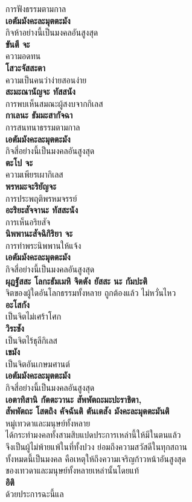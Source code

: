\documentclass[12pt]{article}
\begin{document}
\indent การฟังธรรมตามกาล\\
\textbf{เอตัมมังคะละมุตตะมัง}\\
\indent กิจห้าอย่างนี้เป็นมงคลอันสูงสุด\\
\textbf{ขันตี จะ}\\
\indent ความอดทน\\
\textbf{โสวะจัสสะตา}\\
\indent ความเป็นคนว่าง่ายสอนง่าย\\
\textbf{สะมะณานัญจะ ทัสสนัง}\\
\indent การพบเห็นสมณะผู้สงบจากกิเลส\\
\textbf{กาเลนะ ธัมมะสากัจฉา}\\
\indent การสนทนาธรรมตามกาล\\
\textbf{เอตัมมังคะละมุตตะมัง}\\
\indent กิจสี่อย่างนี้เป็นมงคลอันสูงสุด\\
\textbf{ตะโป จะ}\\
\indent ความเพียรเผากิเลส\\
\textbf{พรหมะจะริยัญจะ}\\
\indent การประพฤติพรหมจรรย์\\
\textbf{อะริยะสัจจานะ ทัสสะนัง}\\
\indent การเห็นอริยสัจ\\
\textbf{นิพพานะสัจฉิกิริยา จะ}\\
\indent การทำพระนิพพานให้แจ้ง\\
\textbf{เอตัมมังคะละมุตตะมัง}\\
\indent กิจสี่อย่างนี้เป็นมงคลอันสูงสุด\\
\textbf{ผุฎฐัสสะ โลกะธัมเมหิ จิตตัง ยัสสะ นะ กัมปะติ}\\
\indent จิตของผู้ใดอันโลกธรรมทั้งหลาย ถูกต้องแล้ว ไม่หวั่นไหว\\
\textbf{อะโสกัง}\\
\indent เป็นจิตไม่เศร้าโศก\\
\textbf{วิระชัง}\\
\indent เป็นจิตไร้ธุลีกิเลส\\
\textbf{เขมัง}\\
\indent เป็นจิตอันเกษมศานต์\\
\textbf{เอตัมมังคะละมุตตะมัง}\\
\indent กิจสี่อย่างนี้เป็นมงคลอันสูงสุด\\
\textbf{เอตาทิสานิ กัตตะวานะ สัพพัตถะมะปะราชิตา,\\
สัพพัตถะ โสตถิง คัจฉันติ ตันเตสัง มังคะละมุตตะมันติ}\\
\indent หมู่เทวดาและมนุษย์ทั้งหลาย \\
\indent ได้กระทำมงคลทั้งสามสิบแปดประการเหล่านี้ให้มีในตนแล้ว \\
\indent จึงเป็นผู้ไม่พ้ายแพ้ในที่ทั้งปวง ย่อมถึงความสวัสดีในทุกสถาน \\
\indent ทั้งหมดนี้เป็นมงคล คือเหตุให้ถึงความเจริญก้าวหน้าอันสูงสุด\\ 
\indent ของเทวดาและมนุษย์ทั้งหลายเหล่านั้นโดยแท้\\
\textbf{อิติ}\\
\indent ด้วยประการฉะนี้แล\\
\end{document}

